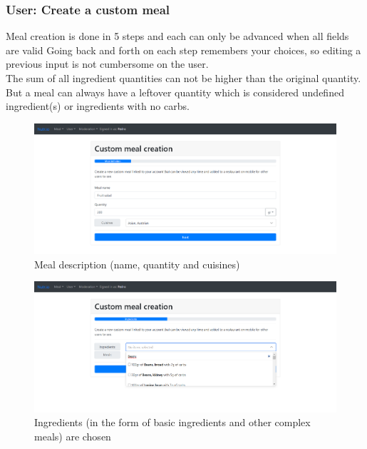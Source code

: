 \subsubsection{User: Create a custom meal}

Meal creation is done in 5 steps and each can only be advanced when all fields are valid
Going back and forth on each step remembers your choices, so editing a previous input is not cumbersome on the user.\\

The sum of all ingredient quantities can not be higher than the original quantity. 
But a meal can always have a leftover quantity which is considered undefined ingredient(s) or ingredients with no carbs.\\

\begin{figure}[H]
    \begin{center}
        \includegraphics[scale=0.4]{_figures/custom-1.png}
        \caption{Meal description (name, quantity and cuisines)}
    \end{center}
\end{figure}

\begin{figure}[H]
    \begin{center}
        \includegraphics[scale=0.4]{_figures/custom-2.png}
        \caption{Ingredients (in the form of basic ingredients and other complex meals) are chosen}
    \end{center}
\end{figure}

